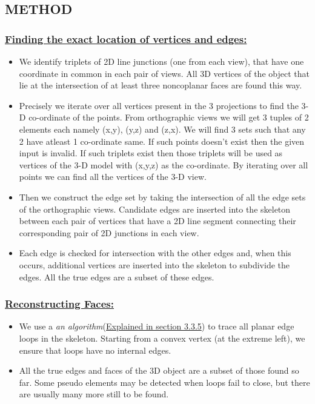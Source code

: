 \documentclass[12pt]{article}
\begin{document}
\subsection{METHOD}

\bigskip
\subsubsection{\large{\underline{Finding the exact location of vertices and edges:}}}
 
\begin{itemize}
    \item We identify triplets of 2D line junctions (one from each view), that have one coordinate in common in each pair of views. All 3D vertices of the object that lie at the intersection of at least three noncoplanar faces are found this way.
    \item Precisely we iterate over all vertices present in the 3 projections to find the 3-D co-ordinate of the points. From orthographic views we will get 3 tuples of 2 elements each namely (x,y), (y,z) and (z,x). We will find 3 sets such that any 2 have atleast 1 co-ordinate same. If such points doesn't exist then the given input is invalid. If such triplets exist then those triplets will be used as vertices of the 3-D model with (x,y,z) as the co-ordinate. By iterating over all points we can find all the vertices of the 3-D view.
    
    \item Then we construct the edge set by taking the intersection of all the edge sets of the orthographic views. Candidate edges are inserted into the skeleton between each pair of vertices that have a 2D line segment connecting their corresponding pair of 2D junctions in each view.
    
    \item Each edge is checked for intersection with the other edges and, when this occurs, additional vertices are inserted into the skeleton to subdivide the edges. All the true edges are a subset of these edges.
\end{itemize}

\bigskip

\subsubsection{\large{\underline{Reconstructing Faces:}}}

\begin{itemize}
    \item We use a \emph{an algorithm}(\underline{Explained in section 3.3.5}) to trace all planar edge loops in the skeleton. Starting from a convex vertex (at the extreme left), we ensure that loops have no internal edges.
    \item All the true edges and faces of the 3D object are a subset of those found so far. Some pseudo elements may be detected when loops fail to close, but there are usually many more still to be found.
\end{itemize}
\end{document}

